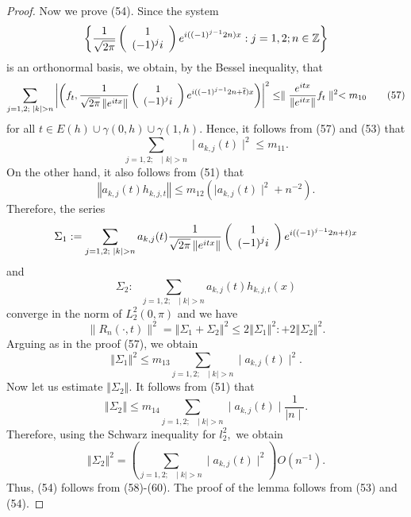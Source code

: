 \documentclass[10pt,a4paper]{amsart}
\begin{document}
\begin{proof}
Now we prove (54). Since the system
\[
\left\{  \frac{1}{\sqrt{2\pi}}\left(
\begin{array}
[c]{c}%
1\\
(-1)^{j}i
\end{array}
\right)  e^{i((-1)^{j-1}2n)x}:j=1,2;n\in\mathbb{Z}\right\}
\]
is an orthonormal basis, we obtain, by the Bessel inequality, that
\begin{equation}
\sum_{j=1,2;\text{ }\mid k\mid>n}\left\vert \left(  f_{t},\frac{1}{\sqrt{2\pi
}\left\Vert e^{itx}\right\Vert }\left(
\begin{array}
[c]{c}%
1\\
(-1)^{j}i
\end{array}
\right)  e^{i((-1)^{j-1}2n+\overline{t})x}\right)  \right\vert ^{2}%
\leq\parallel\frac{e^{itx}}{\left\Vert e^{itx}\right\Vert }f_{t}\parallel
^{2}<m_{10} \tag{57}%
\end{equation}
for all $t\in E(h)\cup\gamma(0,h)\cup\gamma(1,h).$ Hence, it follows from (57)
and (53) that
\[
\sum_{j=1,2;\text{ }\mid k\mid>n}\mid a_{k,j}(t)\mid^{2}\leq m_{11}.
\]
On the other hand, it also follows from (51) that
\[
\left\Vert a_{k,j}(t)h_{k,j,t}\right\Vert \leq m_{12}(\mid a_{k,j}(t)\mid
^{2}+n^{-2}).
\]
Therefore, the series
\[
\Sigma_{1}:=\sum_{j=1,2;\text{ }\mid k\mid>n}a_{k,j}(t)\frac{1}{\sqrt{2\pi
}\left\Vert e^{itx}\right\Vert }\left(
\begin{array}
[c]{c}%
1\\
(-1)^{j}i
\end{array}
\right)  e^{i((-1)^{j-1}2n+t)x}%
\]
and
\[
\Sigma_{2}:\text{ }\sum_{j=1,2;\text{ }\mid k\mid>n}a_{k,j}(t)h_{k,j,t}(x)
\]
converge in the norm of $L_{2}^{2}(0,\pi)$ and we have
\begin{equation}
\parallel R_{n}(\cdot,t)\parallel^{2}=\left\Vert \Sigma_{1}+\Sigma
_{2}\right\Vert ^{2}\leq2\left\Vert \Sigma_{1}\right\Vert ^{2}:+2\left\Vert
\Sigma_{2}\right\Vert ^{2}. \tag{58}%
\end{equation}
Arguing as in the proof (57), we obtain
\begin{equation}
\left\Vert \Sigma_{1}\right\Vert ^{2}\leq m_{13}\sum_{j=1,2;\text{ }\mid
k\mid>n}\mid a_{k,j}(t)\mid^{2}. \tag{59}%
\end{equation}
Now let us estimate $\left\Vert \Sigma_{2}\right\Vert .$ It follows from (51)
that
\[
\left\Vert \Sigma_{2}\right\Vert \leq m_{14}\sum_{j=1,2;\text{ }\mid k\mid
>n}\mid a_{k,j}(t)\mid\frac{1}{\mid n\mid}.
\]
Therefore, using the Schwarz inequality for $l_{2}^{2},$ we obtain
\begin{equation}
\left\Vert \Sigma_{2}\right\Vert ^{2}=\left(  \sum_{j=1,2;\text{ }\mid
k\mid>n}\mid a_{k,j}(t)\mid^{2}\right)  O(n^{-1}). \tag{60}%
\end{equation}
Thus, (54) follows from (58)-(60). The proof of the lemma follows from (53)
and (54).
\end{proof}
\end{document}
